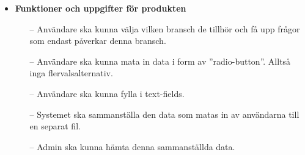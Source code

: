 \documentclass{article}
\begin{document}
    \begin{itemize}
        \item \textbf{Funktioner och uppgifter för produkten}
        \begin{itemize}
            \item [--]Användare ska kunna välja vilken bransch de tillhör och få upp frågor som endast påverkar denna bransch.
        \end{itemize}
          
           \begin{itemize}
            \item [--]Användare ska kunna mata in data i form av ”radio-button”. Alltså inga flervalsalternativ.

        \end{itemize}
          
          \begin{itemize}
            \item [--]Användare ska kunna fylla i text-fields.

        \end{itemize}
          
          \begin{itemize}
            \item [--]Systemet ska sammanställa den data som matas in av användarna till en separat fil.

        \end{itemize}
          
          \begin{itemize}
            \item [--]Admin ska kunna hämta denna sammanställda data.


\end{itemize}
\end{itemize}
\end{document}

